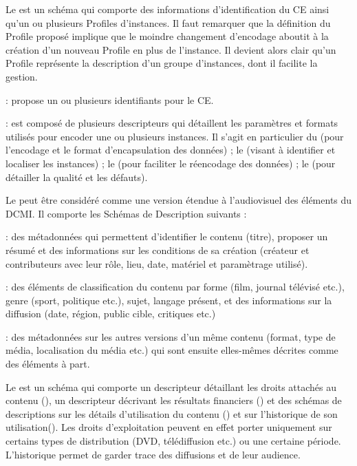 Le  est un schéma qui comporte des informations d'identification du CE ainsi qu'un ou plusieurs Profiles d'instances. 
Il faut remarquer que la définition du Profile proposé implique que le moindre changement d'encodage aboutit à la création d'un nouveau Profile en plus de l'instance. 
Il devient alors clair qu'un Profile représente la description d'un groupe d'instances, dont il facilite la gestion.
\begin{liste}
	\item {} : propose un ou plusieurs identifiants pour le CE.
	\item {} : est composé de plusieurs descripteurs qui détaillent les paramètres et formats utilisés pour encoder une ou plusieurs instances.
	Il s'agit en particulier du  (pour l'encodage et le format d'encapsulation des données) ; le  (visant à identifier et localiser les instances) ; le  (pour faciliter le réencodage des données) ; le  (pour détailler la qualité et les défauts). 
\end{liste}


Le  peut être considéré comme une version étendue à l'audiovisuel des éléments du DCMI. Il comporte les Schémas de Description suivants : 
	\begin{liste}
		\item {} : des métadonnées qui permettent d'identifier le contenu (titre), proposer un résumé et des informations sur les conditions de sa création (créateur et contributeurs avec leur rôle, lieu, date, matériel et paramètrage utilisé).

		\item {} : des éléments de classification du contenu par forme (film, journal télévisé etc.), genre (sport, politique etc.), sujet, langage présent, et des informations sur la diffusion (date, région, public cible, critiques etc.)

		\item {} : des métadonnées sur les autres versions d'un même contenu (format, type de média, localisation du média etc.) qui sont ensuite elles-mêmes décrites comme des éléments à part.
	\end{liste}

Le  est un schéma qui comporte un descripteur détaillant les droits attachés au contenu (), un descripteur décrivant les résultats financiers () et des schémas de descriptions sur les détails d'utilisation du contenu () et sur l'historique de son utilisation().
Les droits d'exploitation peuvent en effet porter uniquement sur certains types de distribution (DVD, télédiffusion etc.) ou une certaine période. 
L'historique permet de garder trace des diffusions et de leur audience.


